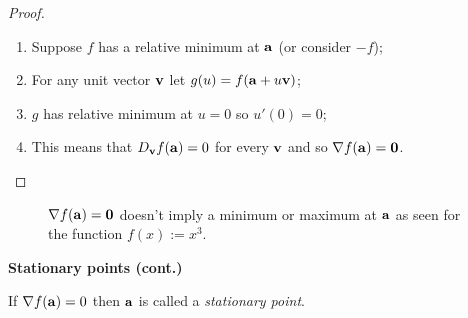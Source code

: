 \begin{proof}
    \begin{enumerate}
        \item Suppose \(f\) has a relative minimum at \(\aa\) (or consider \(-f\));
        \item For any unit vector \(\vv\) let \(g(u) = f(\aa+u\vv)\);
        \item \(g\) has relative minimum at \(u=0\) so \(u'(0)=0\);
        \item This means that \(D_{\vv} f(\aa) = 0\) for every \(\vv\) and so \(\nabla f (\aa)= \mathbf{0}\). \qedhere
    \end{enumerate}
\end{proof}
\begin{figure}
    \caption{\(\nabla f(\aa) =  \mathbf{0}\) doesn't imply a minimum or maximum at \(\aa\) as seen for the function \(f(x):=x^3\).}
\end{figure}






\textbf{Stationary points (cont.)}





\begin{definition}
    If \(\nabla f(\aa)=0\) then \(\aa\) is called a \emph{stationary point}.
\end{definition}



